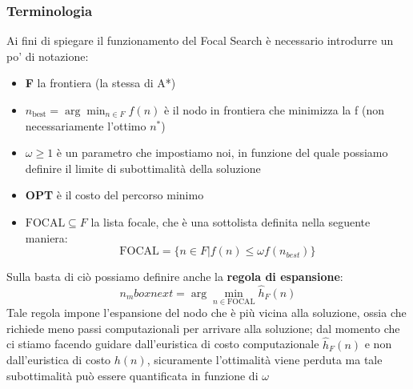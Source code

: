 \subsubsection{Terminologia}
Ai fini di spiegare il funzionamento del Focal Search è necessario introdurre un po' di notazione:
\begin{itemize}
    \item \textbf{F} la frontiera (la stessa di A*)
    \item $n_{\mbox{best}} = \arg \min_{n \in F} f(n)$ è il nodo in frontiera che minimizza la f (non necessariamente l'ottimo $n^*$)
    \item $\omega \geq 1$ è un parametro che impostiamo noi, in funzione del quale possiamo definire il limite di subottimalità della soluzione
    \item \textbf{OPT} è il costo del percorso minimo
    \item $\mbox{FOCAL} \subseteq F$ la lista focale, che è una sottolista definita nella seguente maniera:
    \begin{equation*}
        \mbox{FOCAL} = \{n \in F | f(n) \leq \omega f(n_{best})\}
    \end{equation*}
\end{itemize}
Sulla basta di ciò possiamo definire anche la \textbf{regola di espansione}:\\
\begin{equation*}
    n_mbox{next} = \arg \min_{n \in \mbox{FOCAL}} \hat{h}_F (n)
\end{equation*}
Tale regola impone l'espansione del nodo che è più vicina alla soluzione, ossia che richiede meno passi computazionali per arrivare alla soluzione;
dal momento che ci stiamo facendo guidare dall'euristica di costo computazionale $\hat{h}_F (n)$ e non dall'euristica di costo $h(n)$, sicuramente l'ottimalità viene perduta
ma tale subottimalità può essere quantificata in funzione di $\omega$

